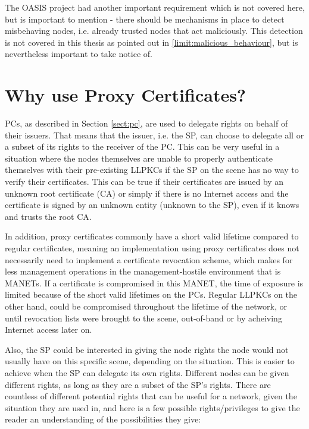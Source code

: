 The OASIS project had another important requirement which is not covered here,
but is important to mention - there should be mechanisms in place to detect
misbehaving nodes, i.e. already trusted nodes that act maliciously. This
detection is not covered in this thesis as pointed out in
\ref{limit:malicious_behaviour}, but is nevertheless important to take notice
of.

\section{Why use Proxy Certificates?}
\acp{PC}, as described in Section \ref{sect:pc}, are used to delegate
rights on behalf of their issuers. That means that the issuer, i.e. the \ac{SP},
can choose to delegate all or a subset of its rights to the receiver of the
\ac{PC}. This can be very useful in a situation where the nodes themselves are
unable to properly authenticate themselves with their pre-existing \acp{LLPKC}
if the \ac{SP} on the scene has no way to verify their certificates. This can be
true if their certificates are issued by an unknown root certificate (\ac{CA})
or simply if there is no Internet access and the certificate is signed by an
unknown entity (unknown to the \ac{SP}), even if it knows and trusts the root
\ac{CA}. 

In addition, proxy certificates commonly have a short valid lifetime compared to
regular certificates, meaning an implementation using proxy certificates does
not necessarily need to implement a certificate revocation scheme, which makes
for less management operations in the management-hostile environment that is
\acp{MANET}. If a certificate is compromised in this \ac{MANET}, the time of
exposure is limited because of the short valid lifetimes on the \acp{PC}.
Regular \acp{LLPKC} on the other hand, could be compromised throughout the
lifetime of the network, or until revocation lists were brought to the scene,
out-of-band or by acheiving Internet access later on.

Also, the \ac{SP} could be interested in giving the node rights the node would
not usually have on this specific scene, depending on the situation. This is
easier to achieve when the \ac{SP} can delegate its own rights. Different nodes
can be given different rights, as long as they are a subset of the SP's rights.
There are countless of different potential rights that can be useful for a
network, given the situation they are used in, and here is a few possible
rights/privileges to give the reader an understanding of the possibilities they
give:

